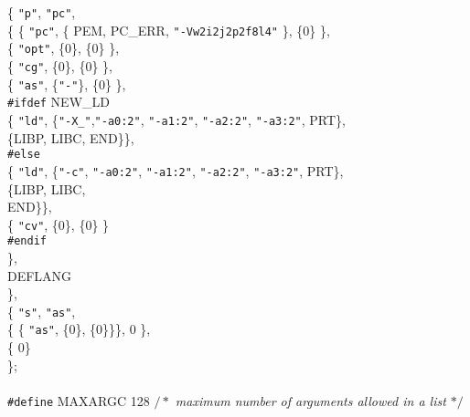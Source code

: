\begin{flushleft}
\{  {\tt"p"}, {\tt"pc"},\mbox{}\\
\hspace*{3\indentation}\{  \{ {\tt"pc"}, \{ PEM, PC\_ERR, {\tt"-Vw2i2j2p2f8l4"} \}, \{0\} \},\mbox{}\\
\hspace*{6\indentation}\{ {\tt"opt"}, \{0\}, \{0\} \},\mbox{}\\
\hspace*{6\indentation}\{ {\tt"cg"}, \{0\}, \{0\} \},\mbox{}\\
\hspace*{6\indentation}\{ {\tt"as"}, \{{\tt"-"}\}, \{0\} \},\mbox{}\\
{\tt \#ifdef} NEW\_LD\mbox{}\\
\hspace*{6\indentation}\{ {\tt"ld"}, \{{\tt"-X\_"},{\tt"-a0:2"}, {\tt"-a1:2"}, {\tt"-a2:2"}, {\tt"-a3:2"}, PRT\},\mbox{}\\
\hspace*{9\indentation}\{LIBP, LIBC, END\}\},\mbox{}\\
{\tt \#else}\mbox{}\\
\hspace*{6\indentation}\{ {\tt"ld"}, \{{\tt"-c"}, {\tt"-a0:2"}, {\tt"-a1:2"}, {\tt"-a2:2"}, {\tt"-a3:2"}, PRT\}, \mbox{}\\
\hspace*{11\indentation}\{LIBP, LIBC,\mbox{}\\
\hspace*{12\indentation}END\}\},\mbox{}\\
\hspace*{6\indentation}\{ {\tt"cv"}, \{0\}, \{0\} \}\mbox{}\\
{\tt \#endif}\mbox{}\\
\hspace*{3\indentation}\},\mbox{}\\
\hspace*{3\indentation}DEFLANG\mbox{}\\
\},\mbox{}\\
\{  {\tt"s"}, {\tt"as"},\mbox{}\\
\hspace*{3\indentation}\{  \{ {\tt"as"}, \{0\}, \{0\}\}\}, 0 \},\mbox{}\\
\{  0\}\mbox{}\\
\};\mbox{}\\
\mbox{}\\
{\tt \#define} MAXARGC   128   {$/\ast$\it{} maximum number of arguments allowed in a list $\ast/$}\mbox{}\\

\end{flushleft}
